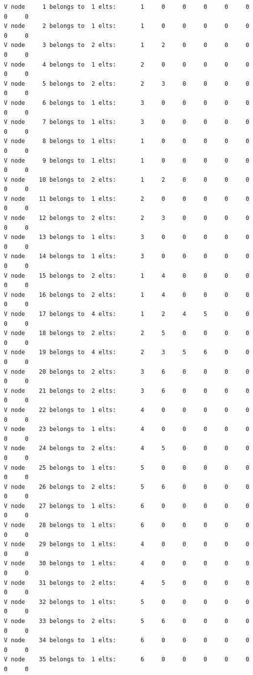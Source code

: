 \begin{small}
\begin{verbatim}
V node     1 belongs to  1 elts:       1     0     0     0     0     0     0     0
V node     2 belongs to  1 elts:       1     0     0     0     0     0     0     0
V node     3 belongs to  2 elts:       1     2     0     0     0     0     0     0
V node     4 belongs to  1 elts:       2     0     0     0     0     0     0     0
V node     5 belongs to  2 elts:       2     3     0     0     0     0     0     0
V node     6 belongs to  1 elts:       3     0     0     0     0     0     0     0
V node     7 belongs to  1 elts:       3     0     0     0     0     0     0     0
V node     8 belongs to  1 elts:       1     0     0     0     0     0     0     0
V node     9 belongs to  1 elts:       1     0     0     0     0     0     0     0
V node    10 belongs to  2 elts:       1     2     0     0     0     0     0     0
V node    11 belongs to  1 elts:       2     0     0     0     0     0     0     0
V node    12 belongs to  2 elts:       2     3     0     0     0     0     0     0
V node    13 belongs to  1 elts:       3     0     0     0     0     0     0     0
V node    14 belongs to  1 elts:       3     0     0     0     0     0     0     0
V node    15 belongs to  2 elts:       1     4     0     0     0     0     0     0
V node    16 belongs to  2 elts:       1     4     0     0     0     0     0     0
V node    17 belongs to  4 elts:       1     2     4     5     0     0     0     0
V node    18 belongs to  2 elts:       2     5     0     0     0     0     0     0
V node    19 belongs to  4 elts:       2     3     5     6     0     0     0     0
V node    20 belongs to  2 elts:       3     6     0     0     0     0     0     0
V node    21 belongs to  2 elts:       3     6     0     0     0     0     0     0
V node    22 belongs to  1 elts:       4     0     0     0     0     0     0     0
V node    23 belongs to  1 elts:       4     0     0     0     0     0     0     0
V node    24 belongs to  2 elts:       4     5     0     0     0     0     0     0
V node    25 belongs to  1 elts:       5     0     0     0     0     0     0     0
V node    26 belongs to  2 elts:       5     6     0     0     0     0     0     0
V node    27 belongs to  1 elts:       6     0     0     0     0     0     0     0
V node    28 belongs to  1 elts:       6     0     0     0     0     0     0     0
V node    29 belongs to  1 elts:       4     0     0     0     0     0     0     0
V node    30 belongs to  1 elts:       4     0     0     0     0     0     0     0
V node    31 belongs to  2 elts:       4     5     0     0     0     0     0     0
V node    32 belongs to  1 elts:       5     0     0     0     0     0     0     0
V node    33 belongs to  2 elts:       5     6     0     0     0     0     0     0
V node    34 belongs to  1 elts:       6     0     0     0     0     0     0     0
V node    35 belongs to  1 elts:       6     0     0     0     0     0     0     0


\end{verbatim}
\end{small}
